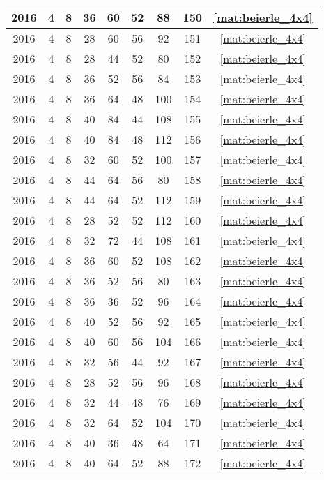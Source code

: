 \begin{longtable}{|c|c|c|c|c|c|c|c|c|}
2016 & 4 & 8 & 36 & 60 & 52 & 88 & 150 & \eqref{mat:beierle_4x4} \\ \hline 
2016 & 4 & 8 & 28 & 60 & 56 & 92 & 151 & \eqref{mat:beierle_4x4} \\ \hline 
2016 & 4 & 8 & 28 & 44 & 52 & 80 & 152 & \eqref{mat:beierle_4x4} \\ \hline 
2016 & 4 & 8 & 36 & 52 & 56 & 84 & 153 & \eqref{mat:beierle_4x4} \\ \hline 
2016 & 4 & 8 & 36 & 64 & 48 & 100 & 154 & \eqref{mat:beierle_4x4} \\ \hline 
2016 & 4 & 8 & 40 & 84 & 44 & 108 & 155 & \eqref{mat:beierle_4x4} \\ \hline 
2016 & 4 & 8 & 40 & 84 & 48 & 112 & 156 & \eqref{mat:beierle_4x4} \\ \hline 
2016 & 4 & 8 & 32 & 60 & 52 & 100 & 157 & \eqref{mat:beierle_4x4} \\ \hline 
2016 & 4 & 8 & 44 & 64 & 56 & 80 & 158 & \eqref{mat:beierle_4x4} \\ \hline 
2016 & 4 & 8 & 44 & 64 & 52 & 112 & 159 & \eqref{mat:beierle_4x4} \\ \hline 
2016 & 4 & 8 & 28 & 52 & 52 & 112 & 160 & \eqref{mat:beierle_4x4} \\ \hline 
2016 & 4 & 8 & 32 & 72 & 44 & 108 & 161 & \eqref{mat:beierle_4x4} \\ \hline 
2016 & 4 & 8 & 36 & 60 & 52 & 108 & 162 & \eqref{mat:beierle_4x4} \\ \hline 
2016 & 4 & 8 & 36 & 52 & 56 & 80 & 163 & \eqref{mat:beierle_4x4} \\ \hline 
2016 & 4 & 8 & 36 & 36 & 52 & 96 & 164 & \eqref{mat:beierle_4x4} \\ \hline 
2016 & 4 & 8 & 40 & 52 & 56 & 92 & 165 & \eqref{mat:beierle_4x4} \\ \hline 
2016 & 4 & 8 & 40 & 60 & 56 & 104 & 166 & \eqref{mat:beierle_4x4} \\ \hline 
2016 & 4 & 8 & 32 & 56 & 44 & 92 & 167 & \eqref{mat:beierle_4x4} \\ \hline 
2016 & 4 & 8 & 28 & 52 & 56 & 96 & 168 & \eqref{mat:beierle_4x4} \\ \hline 
2016 & 4 & 8 & 32 & 44 & 48 & 76 & 169 & \eqref{mat:beierle_4x4} \\ \hline 
2016 & 4 & 8 & 32 & 64 & 52 & 104 & 170 & \eqref{mat:beierle_4x4} \\ \hline 
2016 & 4 & 8 & 40 & 36 & 48 & 64 & 171 & \eqref{mat:beierle_4x4} \\ \hline 
2016 & 4 & 8 & 40 & 64 & 52 & 88 & 172 & \eqref{mat:beierle_4x4} \\ \hline 

\end{longtable}
